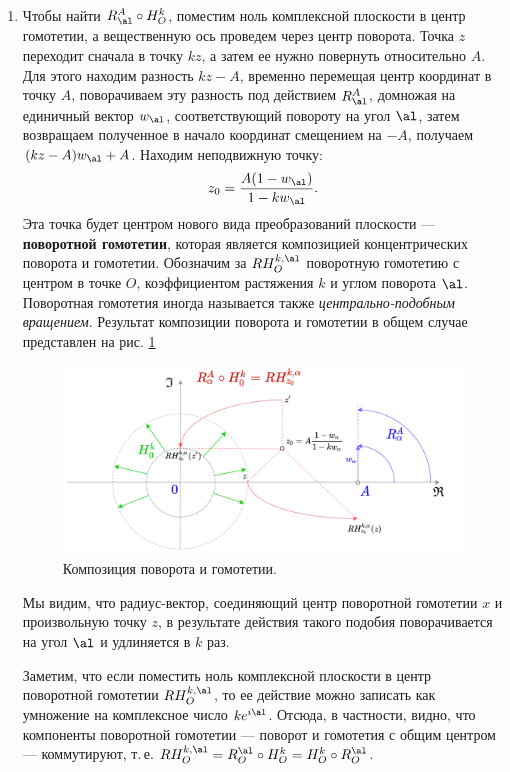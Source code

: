 \begin{enumerate}
\item Чтобы найти $R_\al^A\circ H_O^k$, поместим ноль комплексной плоскости в центр гомотетии, а вещественную ось проведем через центр поворота. Точка $z$ переходит сначала в точку $kz$, а затем ее нужно повернуть относительно $A$. Для этого находим разность $kz-A$, временно перемещая центр координат в точку $A$, поворачиваем эту разность под действием $R_\al^A$, домножая на единичный вектор $w_\al$, соответствующий повороту на угол $\al$, затем возвращаем полученное в начало координат смещением на $-A$, получаем $(kz-A)w_\al+A$. Находим неподвижную точку:
\begin{equation}\label{StatPoint1}
z_0 = \frac{A(1-w_\al)}{1-kw_\al}.
\end{equation}
Эта точка будет центром нового вида преобразований плоскости --- \textbf{поворотной гомотетии}, которая является композицией концентрических поворота и гомотетии. Обозначим за $RH_O^{k,\al}$ поворотную гомотетию с центром в точке $O$, коэффициентом растяжения $k$ и углом поворота $\al$. Поворотная гомотетия иногда называется также \textit{центрально-подобным вращением}. Результат композиции поворота и гомотетии в общем случае представлен на рис. \ref{RotHomot}

\begin{figure}[hbt!]
\begin{center}
\includegraphics[scale=0.25]{RotHomot.png}
\end{center}\caption{Композиция поворота и гомотетии.}\label{RotHomot}
\end{figure}

Мы видим, что радиус-вектор, соединяющий центр поворотной гомотетии $x$ и произвольную точку $z$, в результате действия такого подобия поворачивается на угол $\al$ и удлиняется в $k$ раз.

Заметим, что если поместить ноль комплексной плоскости в центр поворотной гомотетии $RH_O^{k,\al}$, то ее действие можно записать как умножение на комплексное число $ke^{i\al}$. Отсюда, в частности, видно, что компоненты поворотной гомотетии --- поворот и гомотетия с общим центром --- коммутируют, т.\,е. $RH_O^{k,\al}=R_O^\al\circ H_O^k=H_O^k\circ R_O^\al$.


\end{enumerate}
